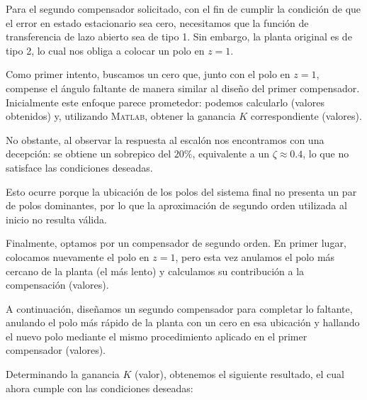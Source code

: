 Para el segundo compensador solicitado, con el fin de cumplir la condición de que el error en estado estacionario sea cero, necesitamos que la función de transferencia de lazo abierto sea de tipo 1. Sin embargo, la planta original es de tipo 2, lo cual nos obliga a colocar un polo en $z=1$.

Como primer intento, buscamos un cero que, junto con el polo en $z=1$, compense el ángulo faltante de manera similar al diseño del primer compensador. Inicialmente este enfoque parece prometedor: podemos calcularlo (valores obtenidos) y, utilizando \textsc{Matlab}, obtener la ganancia $K$ correspondiente (valores).  

No obstante, al observar la respuesta al escalón nos encontramos con una decepción: se obtiene un sobrepico del $20\%$, equivalente a un $\zeta \approx 0.4$, lo que no satisface las condiciones deseadas.  

Esto ocurre porque la ubicación de los polos del sistema final no presenta un par de polos dominantes, por lo que la aproximación de segundo orden utilizada al inicio no resulta válida.

Finalmente, optamos por un compensador de segundo orden. En primer lugar, colocamos nuevamente el polo en $z=1$, pero esta vez anulamos el polo más cercano de la planta (el más lento) y calculamos su contribución a la compensación (valores).  

A continuación, diseñamos un segundo compensador para completar lo faltante, anulando el polo más rápido de la planta con un cero en esa ubicación y hallando el nuevo polo mediante el mismo procedimiento aplicado en el primer compensador (valores).  

Determinando la ganancia $K$ (valor), obtenemos el siguiente resultado, el cual ahora cumple con las condiciones deseadas:  
